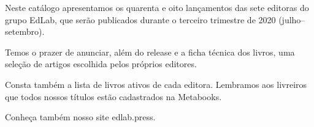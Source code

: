 \blankpage
\pagestyle{indice}

{}

\vspace{1.2cm}

{}


\hspace*{-7cm}\hrulefill\hspace*{-7cm}

\vspace{1cm}

\hspace*{-.5cm}\parbox{180pt}{\raggedright 
Neste catálogo apresentamos os quarenta e oito
lançamentos das sete editoras do grupo EdLab, que serão publicados durante o
terceiro trimestre de 2020 (julho--setembro). 

Temos o prazer de anunciar, além do release e a ficha técnica dos livros, uma 
seleção de artigos escolhida pelos próprios editores. 

Consta também a lista de 
livros ativos de cada editora. Lembramos aos livreiros que todos nossos títulos
estão cadastrados na Metabooks.

Conheça também nosso site edlab.press.
} %

